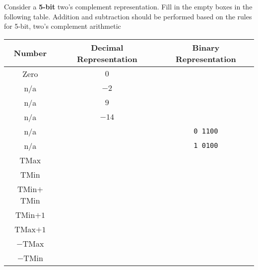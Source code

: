 \begin{problem}{8}

Consider a {\bf 5-bit} two's complement representation.
Fill in the empty boxes in the following table.
Addition and subtraction should be performed based on the rules
for 5-bit, two's complement arithmetic \\

\begin{center}
\renewcommand{\arraystretch}{1.8}
\begin{tabular}{|c|c|c|} 
\hline 
Number    & Decimal Representation & Binary Representation \\ \hline \hline 
Zero      &       $0$                &			   \\ \hline
n/a       &       $-2$               &			   \\ \hline
n/a       &       $9$                &			   \\ \hline
n/a       &       $-14$              &			   \\ \hline
n/a       &                        &   {\tt 0 1100}              \\ \hline
n/a	  &			   &   {\tt 1 0100}		   \\ \hline	
TMax      &                        &   		           \\ \hline
TMin      &                        &                       \\ \hline
TMin$+$TMin &                      &                       \\ \hline
TMin$+1$    &                      &                       \\ \hline
TMax$+1$    &                      &                       \\ \hline
$-$TMax     &                      &                       \\ \hline
$-$TMin     &                      &                       \\ \hline
\end{tabular}
\end{center}

\end{problem}


%

